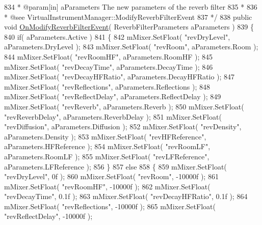 \begin{DoxyCodeInclude}
834 \textcolor{comment}{     * @param[in] aParameters The new parameters of the reverb filter}
835 \textcolor{comment}{     * }
836 \textcolor{comment}{     * @see VirtualInstrumentManager::ModifyReverbFilterEvent}
837 \textcolor{comment}{    */}
838     \textcolor{keyword}{public} \textcolor{keywordtype}{void} \hyperlink{group___v_i_m_handlers_ga2b310217971075b1b2db67d68fbbea5a}{OnModifyReverbFilterEvent}( ReverbFilterParameters aParameters )
839     \{
840         \textcolor{keywordflow}{if}( aParameters.Active )
841         \{
842             mMixer.SetFloat( \textcolor{stringliteral}{"revDryLevel"}, aParameters.DryLevel );
843             mMixer.SetFloat( \textcolor{stringliteral}{"revRoom"}, aParameters.Room );
844             mMixer.SetFloat( \textcolor{stringliteral}{"revRoomHF"}, aParameters.RoomHF );
845             mMixer.SetFloat( \textcolor{stringliteral}{"revDecayTime"}, aParameters.DecayTime );
846             mMixer.SetFloat( \textcolor{stringliteral}{"revDecayHFRatio"}, aParameters.DecayHFRatio );
847             mMixer.SetFloat( \textcolor{stringliteral}{"revReflections"}, aParameters.Reflections );
848             mMixer.SetFloat( \textcolor{stringliteral}{"revReflectDelay"}, aParameters.ReflectDelay );
849             mMixer.SetFloat( \textcolor{stringliteral}{"revReverb"}, aParameters.Reverb );
850             mMixer.SetFloat( \textcolor{stringliteral}{"revReverbDelay"}, aParameters.ReverbDelay );
851             mMixer.SetFloat( \textcolor{stringliteral}{"revDiffusion"}, aParameters.Diffusion );
852             mMixer.SetFloat( \textcolor{stringliteral}{"revDensity"}, aParameters.Density );
853             mMixer.SetFloat( \textcolor{stringliteral}{"revHFReference"}, aParameters.HFReference );
854             mMixer.SetFloat( \textcolor{stringliteral}{"revRoomLF"}, aParameters.RoomLF );
855             mMixer.SetFloat( \textcolor{stringliteral}{"revLFReference"}, aParameters.LFReference );
856         \}
857         \textcolor{keywordflow}{else}
858         \{
859             mMixer.SetFloat( \textcolor{stringliteral}{"revDryLevel"}, 0f );
860             mMixer.SetFloat( \textcolor{stringliteral}{"revRoom"}, -10000f );
861             mMixer.SetFloat( \textcolor{stringliteral}{"revRoomHF"}, -10000f );
862             mMixer.SetFloat( \textcolor{stringliteral}{"revDecayTime"}, 0.1f );
863             mMixer.SetFloat( \textcolor{stringliteral}{"revDecayHFRatio"}, 0.1f );
864             mMixer.SetFloat( \textcolor{stringliteral}{"revReflections"}, -10000f );
865             mMixer.SetFloat( \textcolor{stringliteral}{"revReflectDelay"}, -10000f );

\end{DoxyCodeInclude}

